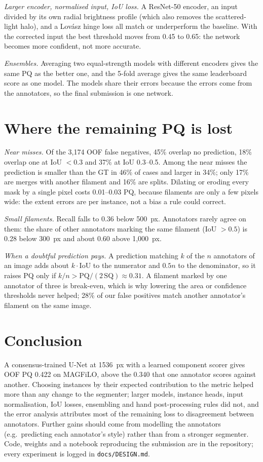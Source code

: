 \documentclass[conference]{IEEEtran}
\begin{document}
\emph{Larger encoder, normalised input, IoU loss.} A ResNet-50 encoder, an input divided by its own
radial brightness profile (which also removes the scattered-light halo), and a Lov\'asz hinge loss all
match or underperform the baseline. With the corrected input the best threshold moves from 0.45 to 0.65:
the network becomes more confident, not more accurate.

\emph{Ensembles.} Averaging two equal-strength models with different encoders gives the same PQ as the
better one, and the 5-fold average gives the same leaderboard score as one model. The models share their
errors because the errors come from the annotators, so the final submission is one network.

\section{Where the remaining PQ is lost}\label{sec:loss}
\emph{Near misses.} Of the 3{,}174 OOF false negatives, 45\% overlap no prediction, 18\% overlap one at
IoU $<0.3$ and 37\% at IoU 0.3--0.5. Among the near misses the prediction is smaller than the GT in 46\% of
cases and larger in 34\%; only 17\% are merges with another filament and 16\% are splits. Dilating or
eroding every mask by a single pixel costs 0.01--0.03 PQ, because filaments are only a few pixels wide:
the extent errors are per instance, not a bias a rule could correct.

\emph{Small filaments.} Recall falls to 0.36 below 500~px. Annotators rarely agree on them: the share of
other annotators marking the same filament (IoU $>0.5$) is 0.28 below 300~px and about 0.60 above
1{,}000~px.

\emph{When a doubtful prediction pays.} A prediction matching $k$ of the $n$ annotators of an image adds
about $k\cdot\mathrm{IoU}$ to the numerator and $0.5n$ to the denominator, so it raises PQ only if
$k/n > \mathrm{PQ}/(2\,\mathrm{SQ}) \approx 0.31$. A filament marked by one annotator of three is break-even,
which is why lowering the area or confidence thresholds never helped; 28\% of our false positives match
another annotator's filament on the same image.

\section{Conclusion}
A consensus-trained U-Net at 1536~px with a learned component scorer gives OOF PQ 0.422 on MAGFiLO, above
the 0.340 that one annotator scores against another. Choosing instances by their expected contribution to
the metric helped more than any change to the segmenter; larger models, instance heads, input
normalisation, IoU losses, ensembling and hand post-processing rules did not, and the error analysis
attributes most of the remaining loss to disagreement between annotators. Further gains should come from modelling the
annotators (e.g.\ predicting each annotator's style) rather than from a stronger segmenter. Code, weights
and a notebook reproducing the submission are in the repository; every experiment is logged in
\texttt{docs/DESIGN.md}.
\end{document}
